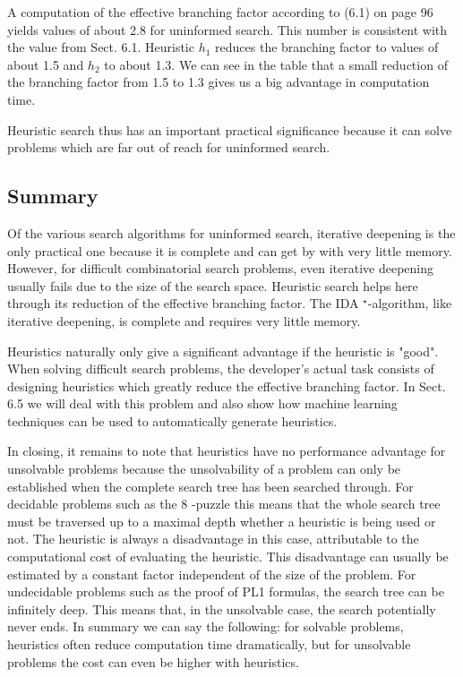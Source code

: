 \documentclass[10pt]{book}
\begin{document}
A computation of the effective branching factor according to (6.1) on page 96 yields values of about 2.8 for uninformed search. This number is consistent with the value from Sect. 6.1. Heuristic $h_{1}$ reduces the branching factor to values of about 1.5 and $h_{2}$ to about 1.3. We can see in the table that a small reduction of the branching factor from 1.5 to 1.3 gives us a big advantage in computation time.

Heuristic search thus has an important practical significance because it can solve problems which are far out of reach for uninformed search.

\subsection{Summary}
Of the various search algorithms for uninformed search, iterative deepening is the only practical one because it is complete and can get by with very little memory. However, for difficult combinatorial search problems, even iterative deepening usually fails due to the size of the search space. Heuristic search helps here through its reduction of the effective branching factor. The IDA ${ }^{\star}$-algorithm, like iterative deepening, is complete and requires very little memory.

Heuristics naturally only give a significant advantage if the heuristic is "good". When solving difficult search problems, the developer's actual task consists of designing heuristics which greatly reduce the effective branching factor. In Sect. 6.5 we will deal with this problem and also show how machine learning techniques can be used to automatically generate heuristics.

In closing, it remains to note that heuristics have no performance advantage for unsolvable problems because the unsolvability of a problem can only be established when the complete search tree has been searched through. For decidable problems such as the 8 -puzzle this means that the whole search tree must be traversed up to a maximal depth whether a heuristic is being used or not. The heuristic is always a disadvantage in this case, attributable to the computational cost of evaluating the heuristic. This disadvantage can usually be estimated by a constant factor independent of the size of the problem. For undecidable problems such as the proof of PL1 formulas, the search tree can be infinitely deep. This means that, in the unsolvable case, the search potentially never ends. In summary we can say the following: for solvable problems, heuristics often reduce computation time dramatically, but for unsolvable problems the cost can even be higher with heuristics.
\end{document}

